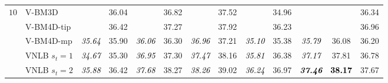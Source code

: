 \documentclass[10pt, journal, twocolumn, final, a4paper]{IEEEtran}
\newcommand{\best}[1]{#1}
\newcommand{\bsic}[1]{\textcolor{black}{\textit{#1}}}
\newcommand{\Bsic}[1]{\textcolor{black}{\textbf{\textit{#1}}}}
\newcommand{\Best}[1]{\textbf{\textcolor{black}{#1}}}
\begin{document}
\begin{table}[htp!]
\begin{center}
{\begin{tabular}{ c | l |c c | c c | c c | c c | c c | c}
%
			\multirow{1}{*}{$10$}
			                      & V-BM3D               & \bsic{     } &       36.04  & \bsic{     } &       36.82  & \bsic{     } &       37.52  & \bsic{     } &       34.96  & \bsic{     } &              &       36.34  \\
			                      & V-BM4D-tip           & \bsic{     } & \best{36.42} & \bsic{     } & \best{37.27} & \bsic{     } &       37.92  & \bsic{     } &       36.23  & \bsic{     } &              &       36.96  \\
			                      & V-BM4D-mp            & \bsic{35.64} &       35.90  & \bsic{36.06} &       36.30  & \bsic{36.96} &       37.21  & \bsic{35.10} &       35.38  & \bsic{35.79} &       36.08  &       36.20  \\
			                      & VNLB   $s_t = 1$     & \bsic{34.67} &       35.30  & \bsic{36.95} &       37.30  & \bsic{37.47} &       38.16  & \bsic{35.81} &       36.38  & \bsic{37.17} &       37.81  &       36.78  \\
			                      & VNLB   $s_t = 2$     & \bsic{35.88} &       36.42  & \bsic{37.68} &       38.27  & \bsic{38.26} &       39.02  & \bsic{36.24} &       36.97  & \Bsic{37.46} & \Best{38.17} &       37.67  \\

\end{tabular}}
\end{center}
\end{table}
\end{document}
